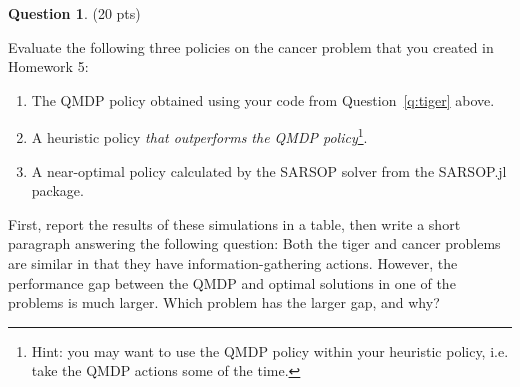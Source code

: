 \documentclass{article}
\theoremstyle{definition}
\newtheorem{question}[thm]{Question}
\begin{document}
\begin{question}
    (20 pts)

    Evaluate the following three policies on the cancer problem that you created in Homework 5:
    \begin{enumerate}[noitemsep]
        \item The QMDP policy obtained using your code from Question~\ref{q:tiger} above.
        \item A heuristic policy \emph{that outperforms the QMDP policy}\footnote{Hint: you may want to use the QMDP policy within your heuristic policy, i.e. take the QMDP actions some of the time.}.
        \item A near-optimal policy calculated by the SARSOP solver from the SARSOP.jl package.
    \end{enumerate}
    First, report the results of these simulations in a table, then write a short paragraph answering the following question: Both the tiger and cancer problems are similar in that they have information-gathering actions. However, the performance gap between the QMDP and optimal solutions in one of the problems is much larger. Which problem has the larger gap, and why?
\end{question}

\clearpage
\end{document}
